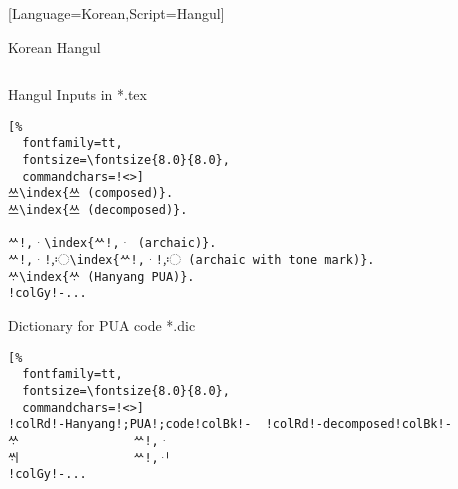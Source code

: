 \documentclass[aspectratio=169,10pt]{beamer}
\begin{document}
\setmonofont{Noto Sans Mono CJK KR}[Language=Korean,Script=Hangul]
\begin{frame}[fragile]{Korean Hangul}

\begin{columns}
\begin{column}{70mm}

\setmonofont{Noto Sans Mono CJK KR}
\begin{exampleblock}{Hangul Inputs in *.tex}
\begin{Verbatim}[%
  fontfamily=tt,
  fontsize=\fontsize{8.0}{8.0},
  commandchars=!<>]
쓰\index{쓰 (composed)}.
쓰\index{쓰 (decomposed)}.

ᄊ!,ᆞ\index{ᄊ!,ᆞ (archaic)}.
ᄊ!,ᆞ!,〯\index{ᄊ!,ᆞ!,〯 (archaic with tone mark)}.
ᄊᆞ\index{ᄊᆞ (Hanyang PUA)}.
!colGy!-...
\end{Verbatim}
\end{exampleblock}
\begin{exampleblock}{Dictionary for PUA code *.dic}
\begin{Verbatim}[%
  fontfamily=tt,
  fontsize=\fontsize{8.0}{8.0},
  commandchars=!<>]
!colRd!-Hanyang!;PUA!;code!colBk!-  !colRd!-decomposed!colBk!-
ᄊᆞ                ᄊ!,ᆞ
ᄊᆡ                ᄊ!,ᆡ
!colGy!-...
\end{Verbatim}
\end{exampleblock}
\end{column}

\begin{column}{60mm}
\begin{center}
%
\end{center}
\end{column}
\end{columns}

\end{frame}

\end{document}
